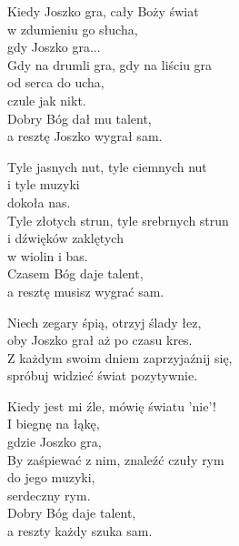 \begin{text}
    Kiedy Joszko gra, cały Boży świat\\
    w zdumieniu go słucha,\\
    gdy Joszko gra...\\
    Gdy na drumli gra, gdy na liściu gra\\
    od serca do ucha,\\
    czule jak nikt.\\
    Dobry Bóg dał mu talent,\\
    a resztę Joszko wygrał sam.

    Tyle jasnych nut, tyle ciemnych nut\\
    i tyle muzyki\\
    dokoła nas.\\
    Tyle złotych strun, tyle srebrnych strun\\
    i dźwięków zaklętych\\
    w wiolin i bas.\\
    Czasem Bóg daje talent,\\
    a resztę musisz wygrać sam.

    \vin Niech zegary śpią, otrzyj ślady łez,\\
    \vin oby Joszko grał aż po czasu kres.\\
    \vin Z każdym swoim dniem zaprzyjaźnij się,\\
    \vin spróbuj widzieć świat pozytywnie.

    Kiedy jest mi źle, mówię światu 'nie'!\\
    I biegnę na łąkę,\\
    gdzie Joszko gra,\\
    By zaśpiewać z nim, znaleźć czuły rym\\
    do jego muzyki,\\
    serdeczny rym.\\
    Dobry Bóg daje talent,\\
    a reszty każdy szuka sam.
\end{text}
